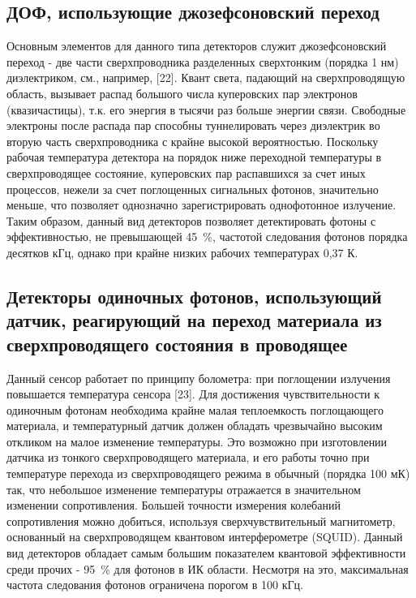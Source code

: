 \subsection{ДОФ, использующие джозефсоновский переход} \label{subsec:ch1/sec5/sub4}

Основным элементов для данного типа детекторов служит джозефсоновский переход - две части сверхпроводника разделенных сверхтонким (порядка 1 нм) диэлектриком, см., например, [22]. Квант света, падающий на сверхпроводящую область, вызывает распад большого числа куперовских пар электронов (квазичастицы), т.\:к. его энергия в тысячи раз больше энергии связи. Свободные электроны после распада пар способны туннелировать через диэлектрик во вторую часть сверхпроводника с крайне высокой вероятностью. Поскольку рабочая температура детектора на порядок ниже переходной температуры в сверхпроводящее состояние, куперовских пар распавшихся за счет иных процессов, нежели за счет поглощенных сигнальных фотонов, значительно меньше, что позволяет однозначно зарегистрировать однофотонное излучение. Таким образом, данный вид детекторов позволяет детектировать фотоны с эффективностью, не превышающей 45~\%, частотой следования фотонов порядка десятков кГц, однако при крайне низких рабочих температурах 0,37 К.

\subsection{Детекторы одиночных фотонов, использующий датчик, реагирующий на переход материала из сверхпроводящего состояния в проводящее} \label{subsec:ch1/sec5/sub5}

Данный сенсор работает по принципу болометра: при поглощении излучения повышается температура сенсора [23]. Для достижения чувствительности к одиночным фотонам необходима крайне малая теплоемкость поглощающего материала, и температурный датчик должен обладать чрезвычайно высоким откликом на малое изменение температуры. Это возможно при изготовлении датчика из тонкого сверхпроводящего материала, и его работы точно при температуре перехода из сверхпроводящего режима в обычный (порядка 100 мК) так, что небольшое изменение температуры отражается в значительном изменении сопротивления. Большей точности измерения колебаний сопротивления можно добиться, используя сверхчувствительный магнитометр, основанный на сверхпроводящем квантовом интерферометре (SQUID). Данный вид детекторов обладает самым большим показателем квантовой эффективности среди прочих - 95~\% для фотонов в ИК области. Несмотря на это, максимальная частота следования фотонов ограничена порогом в 100 кГц.

